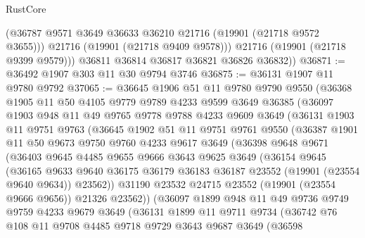 \begin{lexlean}{RustCore}
\begin{coremodule}
            (@36787 @9571 @3649 @36633 @36210 @21716 (@19901 (@21718 @9572 @3655)))
            @21716
            (@19901 (@21718 @9409 @9578)))
          @21716
          (@19901 (@21718 @9399 @9579)))
        @36811
        @36814
        @36817
        @36821
        @36826
        @36832))
@36871 := @36492 @1907 @303 @11 @30 @9794 @3746
@36875 := @36131 @1907 @11 @9780 @9792
@37065 := @36645
    @1906
    @51
    @11
    @9780
    @9790
    @9550
    (@36368
      @1905
      @11
      @50
      @4105
      @9779
      @9789
      @4233
      @9599
      @3649
      @36385
      (@36097
        @1903
        @948
        @11
        @49
        @9765
        @9778
        @9788
        @4233
        @9609
        @3649
        (@36131
          @1903
          @11
          @9751
          @9763
          (@36645
            @1902
            @51
            @11
            @9751
            @9761
            @9550
            (@36387
              @1901
              @11
              @50
              @9673
              @9750
              @9760
              @4233
              @9617
              @3649
              (@36398
                @9648
                @9671
                (@36403
                  @9645
                  @4485
                  @9655
                  @9666
                  @3643
                  @9625
                  @3649
                  (@36154
                    @9645
                    (@36165
                      @9633
                      @9640
                      @36175
                      @36179
                      @36183
                      @36187
                      @23552
                      (@19901 (@23554 @9640 @9634))
                      @23562))
                  @31190
                  @23532
                  @24715
                  @23552
                  (@19901 (@23554 @9666 @9656))
                  @21326
                  @23562))
              (@36097
                @1899
                @948
                @11
                @49
                @9736
                @9749
                @9759
                @4233
                @9679
                @3649
                (@36131
                  @1899
                  @11
                  @9711
                  @9734
                  (@36742
                    @76
                    @108
                    @11
                    @9708
                    @4485
                    @9718
                    @9729
                    @3643
                    @9687
                    @3649
                    (@36598

\end{coremodule}
\end{lexlean}

